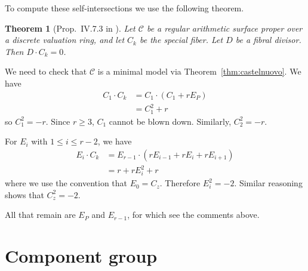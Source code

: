 \documentclass{article}
\newcommand{\scd}{\mathscr{C}}
\theoremstyle{plain}
\newtheorem{theorem}{Theorem}[section]
\theoremstyle{definition}
\theoremstyle{remark}
\begin{document}
To compute these self-intersections we use the following theorem.
\begin{theorem}[Prop.~IV.7.3 in \cite{silvermanATAEC}]\label{thm:fibral-intersect-total}
  Let $\scd$ be a regular arithmetic surface proper over a discrete valuation ring, and let $C_k$ be the special fiber. Let $D$ be a fibral divisor. Then $D \cdot C_k = 0$.
\end{theorem}

We need to check that $\scd$ is a minimal model via Theorem~\ref{thm:castelnuovo}. We have
\begin{align*}
  C_1 \cdot C_k &= C_1 \cdot (C_1 + rE_{P}) \\
  &= C_1^2 + r
\end{align*}
so $C_1^2 = -r$. Since $r \geq 3$, $C_1$ cannot be blown down. Similarly, $C_2^2 = -r$.

For $E_{i}$ with $1 \leq i \leq r-2$, we have
\begin{align*}
  E_{i} \cdot C_k &= E_{r-1} \cdot (rE_{i-1} + rE_{i} + rE_{i+1}) \\
  &= r + rE_i^2 + r
\end{align*}
where we use the convention that $E_0 = C_z$. Therefore $E_i^2 = -2$. Similar reasoning shows that $C_z^2 = -2$.

All that remain are $E_P$ and $E_{r-1}$, for which see the comments above.

\section{Component group}
\label{sec:component-group}





\end{document}

